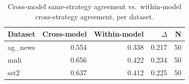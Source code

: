 \begin{table}[t]
\centering
\caption{Cross-model same-strategy agreement vs.\ within-model cross-strategy agreement, per dataset.}
\label{tab:crossmodel}
\begin{tabular}{lrrrr}
\toprule
Dataset & Cross-model & Within-model & $\Delta$ & N \\
\midrule
ag_news & 0.554 & 0.338 & 0.217 & 50 \\
mnli & 0.656 & 0.422 & 0.234 & 50 \\
sst2 & 0.637 & 0.412 & 0.225 & 50 \\
\bottomrule
\end{tabular}
\end{table}
